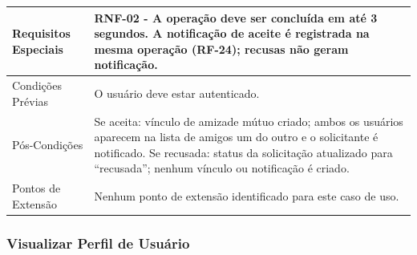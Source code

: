 \begin{longtable}{ >{\raggedright}p{2.8cm} | >{\raggedright\arraybackslash}p{10.7cm} }
Requisitos Especiais & RNF-02 - A operação deve ser concluída em até 3 segundos. A notificação de aceite é registrada na mesma operação (RF-24); recusas não geram notificação. \\ \hline

Condições Prévias & O usuário deve estar autenticado. \\ \hline

Pós-Condições & Se aceita: vínculo de amizade mútuo criado; ambos os usuários aparecem na lista de amigos um do outro e o solicitante é notificado. Se recusada: status da solicitação atualizado para ``recusada''; nenhum vínculo ou notificação é criado. \\ \hline

Pontos de Extensão & Nenhum ponto de extensão identificado para este caso de uso. \\
\end{longtable}
\renewcommand{\arraystretch}{1}
\FloatBarrier


\subsubsection{Visualizar Perfil de Usuário}

